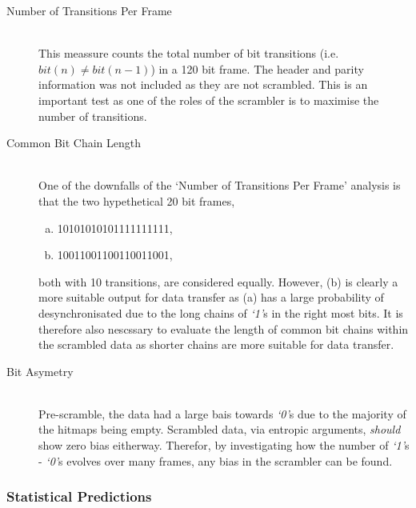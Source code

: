 			\begin{description}
				\item[Number of Transitions Per Frame] \hfill \\
					This meassure counts the total number of bit transitions (i.e. $bit(n) \neq bit(n-1)$) in a 120 bit frame. 
					The header and parity information was not included as they are not scrambled.
					This is an important test as one of the roles of the scrambler is to maximise the number of transitions.

				\item[Common Bit Chain Length] \hfill \\
					One of the downfalls of the `Number of Transitions Per Frame' analysis is that the two hypethetical 20 bit frames,

					\begin{enumerate}[a)]
						\item \textsc{10101010101111111111},
						\item \textsc{10011001100110011001},
					\end{enumerate}

					both with 10 transitions, are considered equally. However, (b) is clearly a more suitable output for data transfer as (a) has a large probability of desynchronisated due to the long chains of \textit{`1'}s in the right most bits.
					It is therefore also nescssary to evaluate the length of common bit chains within the scrambled data as shorter chains are more suitable for data transfer.

				\item[Bit Asymetry] \hfill \\
					Pre-scramble, the data had a large bais towards \textit{`0'}s due to the majority of the hitmaps being empty.
					Scrambled data, via entropic arguments, \textit{should} show zero bias eitherway.
					Therefor, by investigating how the number of \textit{`1'}s - \textit{`0'}s evolves over many frames, any bias in the scrambler can be found.

			\end{description}	

		\subsubsection{Statistical Predictions} %
		\label{subsub:statistical_predictions}

